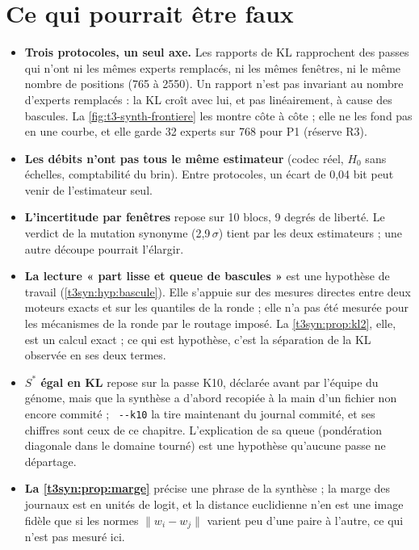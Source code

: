 \section{Ce qui pourrait être faux}\label{t3syn:sec:faux}

\begin{faux}
\begin{itemize}
\item \textbf{Trois protocoles, un seul axe.} Les rapports de KL rapprochent des passes qui n'ont ni les mêmes experts remplacés, ni les mêmes fenêtres, ni le même nombre de positions (765 à \num{2550}). Un rapport n'est pas invariant au nombre d'experts remplacés : la KL croît avec lui, et pas linéairement, à cause des bascules. La \cref{fig:t3-synth-frontiere} les montre côte à côte ; elle ne les fond pas en une courbe, et elle garde 32 experts sur 768 pour P1 (réserve R3).
\item \textbf{Les débits n'ont pas tous le même estimateur} (codec réel, $H_0$ sans échelles, comptabilité du brin). Entre protocoles, un écart de 0,04 bit peut venir de l'estimateur seul.
\item \textbf{L'incertitude par fenêtres} repose sur 10 blocs, 9 degrés de liberté. Le verdict de la mutation synonyme (2,9\,$\sigma$) tient par les deux estimateurs ; une autre découpe pourrait l'élargir.
\item \textbf{La lecture « part lisse et queue de bascules »} est une hypothèse de travail (\cref{t3syn:hyp:bascule}). Elle s'appuie sur des mesures directes entre deux moteurs exacts et sur les quantiles de la ronde ; elle n'a pas été mesurée pour les mécanismes de la ronde par le routage imposé. La \cref{t3syn:prop:kl2}, elle, est un calcul exact ; ce qui est hypothèse, c'est la séparation de la KL observée en ses deux termes.
\item \textbf{$S^{*}$ égal en KL} repose sur la passe K10, déclarée avant par l'équipe du génome, mais que la synthèse a d'abord recopiée à la main d'un fichier non encore commité ; ~\texttt{-{}-k10} la tire maintenant du journal commité, et ses chiffres sont ceux de ce chapitre. L'explication de sa queue (pondération diagonale dans le domaine tourné) est une hypothèse qu'aucune passe ne départage.
\item \textbf{La \cref{t3syn:prop:marge}} précise une phrase de la synthèse ; la marge des journaux est en unités de logit, et la distance euclidienne n'en est une image fidèle que si les normes $\|w_i - w_j\|$ varient peu d'une paire à l'autre, ce qui n'est pas mesuré ici.

\end{itemize}
\end{faux}
